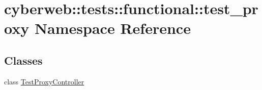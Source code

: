 \hypertarget{namespacecyberweb_1_1tests_1_1functional_1_1test__proxy}{\section{cyberweb\-:\-:tests\-:\-:functional\-:\-:test\-\_\-proxy \-Namespace \-Reference}
\label{namespacecyberweb_1_1tests_1_1functional_1_1test__proxy}
}
\subsection*{\-Classes}
\begin{DoxyCompactItemize}
\item 
class \hyperlink{classcyberweb_1_1tests_1_1functional_1_1test__proxy_1_1_test_proxy_controller}{\-Test\-Proxy\-Controller}
\end{DoxyCompactItemize}
